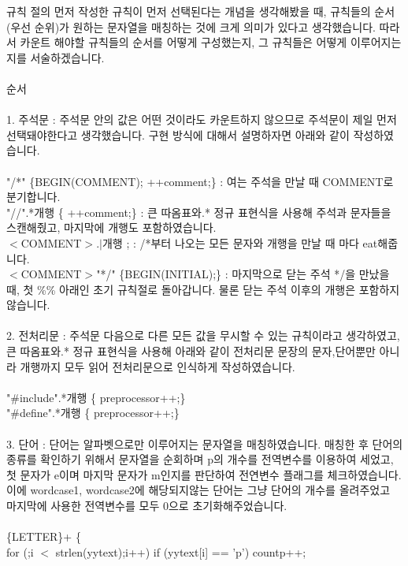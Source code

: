 \documentclass{article}
\begin{document}
        규칙 절의 먼저 작성한 규칙이 먼저 선택된다는 개념을 생각해봤을 때, 규칙들의 순서(우선 순위)가 원하는 문자열을 매칭하는 것에 크게 의미가 있다고 생각했습니다.
        따라서 카운트 해야할 규칙들의 순서를 어떻게 구성했는지, 그 규칙들은 어떻게 이루어지는지를 서술하겠습니다.\\
        \\순서\\ 
        \\1. 주석문 : 주석문 안의 값은 어떤 것이라도 카운트하지 않으므로 주석문이 제일 먼저 선택돼야한다고 생각했습니다. 
        구현 방식에 대해서 설명하자면 아래와 같이 작성하였습니다.\\
        \\
        "/*"    \{BEGIN(COMMENT); ++comment;\} : 여는 주석을 만날 때 COMMENT로 분기합니다.\\
        "//".*개행 \{ ++comment;\} : 큰 따옴표와.* 정규 표현식을 사용해 주석과 문자들을 스캔해줬고, 마지막에 개행도 포함하였습니다. \\
        $<$COMMENT$>$.$|$개행	; : /*부터 나오는 모든 문자와 개행을 만날 때 마다 eat해줍니다.\\ 
        $<$COMMENT$>$"*/"  	\{BEGIN(INITIAL);\} : 마지막으로 닫는 주석 */을 만났을 때, 첫 \%\% 아래인 초기 규칙절로 돌아갑니다.
        물론 닫는 주석 이후의 개행은 포함하지않습니다.\\ 
        \\2. 전처리문 : 주석문 다음으로 다른 모든 값을 무시할 수 있는 규칙이라고 생각하였고, 큰 따옴표와.* 정규 표현식을 사용해 아래와 같이 전처리문 문장의 문자,단어뿐만 아니라 개행까지 모두 읽어 전처리문으로
        인식하게 작성하였습니다.\\
        \\
        "\#include".*개행 \{ preprocessor++;\}\\
        "\#define".*개행	\{ preprocessor++;\}\\ 
        \\3. 단어 : 단어는 알파벳으로만 이루어지는 문자열을 매칭하였습니다. 
        매칭한 후 단어의 종류를 확인하기 위해서 문자열을 순회하며 p의 개수를 전역변수를 이용하여 세었고, 첫 문자가 e이며 마지막 문자가 m인지를 판단하여 전연변수 플래그를 체크하였습니다.
        이에 wordcase1, wordcase2에 해당되지않는 단어는 그냥 단어의 개수를 올려주었고 마지막에 사용한 전역변수를 모두 0으로 초기화해주었습니다.\\ 
        \\
        \{LETTER\}+	\{\\
		 for (;i $<$ strlen(yytext);i++) if (yytext[i] == 'p') countp++; \\
\end{document}
